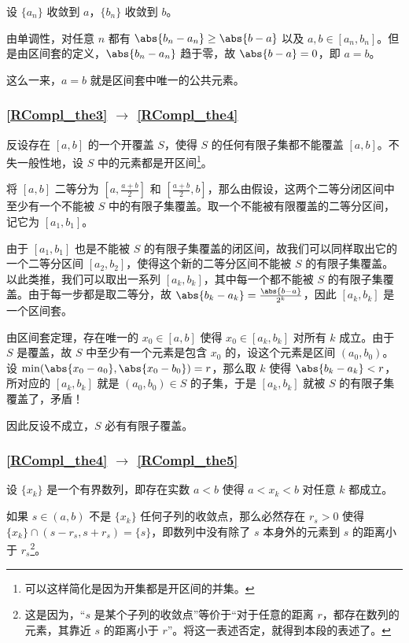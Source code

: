 设 $\{a_n\}$ 收敛到 $a$，$\{b_n\}$ 收敛到 $b$。

由单调性，对任意 $n$ 都有 $\abs{b_n-a_n}\geq\abs{b-a}$ 以及 $a, b\in [a_n, b_n]$。但是由区间套的定义，$\abs{b_n-a_n}$ 趋于零，故 $\abs{b-a}=0$，即 $a=b$。

这么一来，$a=b$ 就是区间套中唯一的公共元素。

\subsubsection{\autoref{RCompl_the3} $\to$ \autoref{RCompl_the4} }

反设存在 $[a, b]$ 的一个开覆盖 $S$，使得 $S$ 的任何有限子集都不能覆盖 $[a, b]$。不失一般性地，设 $S$ 中的元素都是开区间\footnote{可以这样简化是因为开集都是开区间的并集。}。

将 $[a, b]$ 二等分为 $[a, \frac{a+b}{2}]$ 和 $[\frac{a+b}{2}, b]$，那么由假设，这两个二等分闭区间中至少有一个不能被 $S$ 中的有限子集覆盖。取一个不能被有限覆盖的二等分区间，记它为 $[a_1, b_1]$。

由于 $[a_1, b_1]$ 也是不能被 $S$ 的有限子集覆盖的闭区间，故我们可以同样取出它的一个二等分区间 $[a_2, b_2]$，使得这个新的二等分区间不能被 $S$ 的有限子集覆盖。以此类推，我们可以取出一系列 $[a_k, b_k]$，其中每一个都不能被 $S$ 的有限子集覆盖。由于每一步都是取二等分，故 $\abs{b_k-a_k}=\frac{\abs{b-a}}{2^k}$，因此 $[a_k, b_k]$ 是一个区间套。

由区间套定理，存在唯一的 $x_0\in[a, b]$ 使得 $x_0\in[a_k, b_k]$ 对所有 $k$ 成立。由于 $S$ 是覆盖，故 $S$ 中至少有一个元素是包含 $x_0$ 的，设这个元素是区间 $(a_0, b_0)$。设 $\min(\abs{x_0-a_0}, \abs{x_0-b_0})=r$，那么取 $k$ 使得 $\abs{b_k-a_k}<r$，所对应的 $[a_k, b_k]$ 就是 $(a_0, b_0)\in S$ 的子集，于是 $[a_k, b_k]$ 就被 $S$ 的有限子集覆盖了，矛盾！

因此反设不成立，$S$ 必有有限子覆盖。

\subsubsection{\autoref{RCompl_the4} $\to$ \autoref{RCompl_the5} }

设 $\{x_k\}$ 是一个有界数列，即存在实数 $a<b$ 使得 $a<x_k<b$ 对任意 $k$ 都成立。

如果 $s\in(a, b)$ 不是 $\{x_k\}$ 任何子列的收敛点，那么必然存在 $r_s>0$ 使得 $\{x_k\}\cap (s-r_s, s+r_s)=\{s\}$，即数列中没有除了 $s$ 本身外的元素到 $s$ 的距离小于 $r_s$\footnote{这是因为，“$s$ 是某个子列的收敛点”等价于“对于任意的距离 $r$，都存在数列的元素，其靠近 $s$ 的距离小于 $r$”。将这一表述否定，就得到本段的表述了。}。

